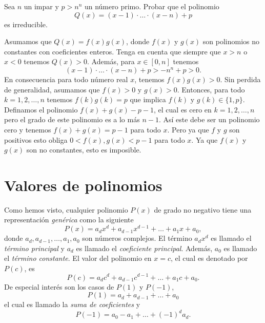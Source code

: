 \begin{example}
    Sea $n$ un impar y $p > n^n$ un número primo.
    Probar que el polinomio
    \[
        Q(x) = (x - 1)\cdot \ldots \cdot (x - n) + p
    \]
    es irreducible.
\end{example}
\begin{solution}
    Asumamos que $Q(x) = f(x) g(x)$, donde $f(x)$ y $g(x)$ son polinomios no constantes con coeficientes enteros.
    Tenga en cuenta que siempre que $x > n$ o $x < 0$ tenemos $Q(x) > 0$.
    Además, para $x \in \left[0, n\right]$ tenemos
    \[
        (x - 1)\cdot \ldots \cdot (x - n) + p > -n^n + p > 0.
    \]
    En consecuencia para todo número real $x$, tenemos $f(x) g(x) > 0$.
    Sin perdida de generalidad, asumamos que $f(x) > 0$ y $g(x) > 0$.
    Entonces, para todo $k = 1, 2, \ldots, n$ tenemos $f(k) g(k) = p$ que implica $f(k)$ y $g(k) \in \{1, p\}$.
    Definamos el polinomio $f(x) + g(x) - p - 1$, el cual es cero en $k = 1,2, \ldots, n$ pero el grado de este polinomio es a lo más $n - 1$.
    Así este debe ser un polinomio cero y tenemos $f(x) + g(x) = p - 1$ para todo $x$.
    Pero ya que $f$ y $g$ son positivos esto obliga $0 < f(x), g(x) < p - 1$ para todo $x$.
    Ya que $f(x)$ y $g(x)$ son no constantes, esto es imposible.
\end{solution}





\section{Valores de polinomios}

Como hemos visto, cualquier polinomio $P(x)$ de grado no negativo tiene una representación \textit{genérica} como la siguiente
\[
    P(x) = a_d x^d + a_{d - 1} x^{d - 1} + \ldots + a_1 x + a_0,
\]
donde $a_d, a_{d - 1}, \ldots, a_1, a_0$ son números complejos.
El término $a_d x^d$ es llamado el \textit{término principal}  y $a_d$ es llamado el \textit{coeficiente principal}.
Además, $a_0$ es llamado el \textit{término constante}.
El valor del polinomio en $x = c$, el cual es denotado por $P(c)$, es
\[
    P(c) = a_d c^d + a_{d - 1}c^{d - 1} + \ldots + a_1 c + a_0.
\]
De especial interés son los casos de $P(1)$ y $P(-1)$, \ie
\[
    P(1) = a_d + a_{d - 1} + \ldots + a_0
\]
el cual es llamado la \textit{suma de coeficientes} y
\[
    P(-1) = a_0 - a_1 + \ldots + (-1)^d a_d.
\]


